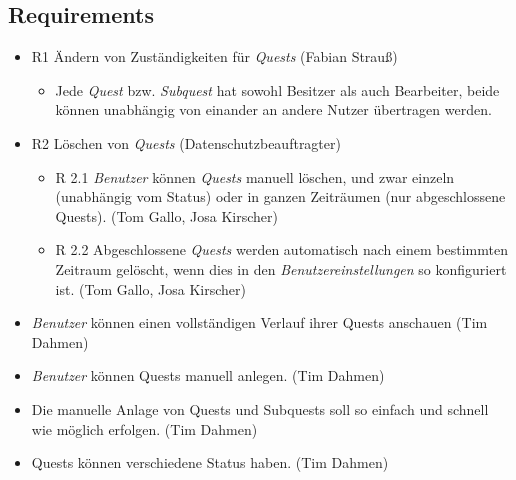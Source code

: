 \documentclass{article}
\begin{document}
\subsection{Requirements}

\begin{itemize}
\item R1 Ändern von Zuständigkeiten für \textit{Quests} (Fabian Strauß)
    \begin{itemize}
        \item Jede \textit{Quest} bzw. \textit{Subquest} hat sowohl Besitzer als auch Bearbeiter, beide können unabhängig von einander an andere Nutzer übertragen werden.
    \end{itemize}

\item R2 Löschen von \textit{Quests} (Datenschutzbeauftragter) 
	\begin{itemize}
	\item R 2.1 \textit{Benutzer} können \textit{Quests} manuell löschen, und zwar einzeln (unabhängig vom Status) oder in ganzen Zeiträumen (nur abgeschlossene Quests). (Tom Gallo, Josa Kirscher) 
	\item R 2.2 Abgeschlossene \textit{Quests} werden automatisch nach einem bestimmten Zeitraum gelöscht, wenn dies in den \textit{Benutzereinstellungen} so konfiguriert ist. (Tom Gallo, Josa Kirscher)
	\end{itemize}

\item \textit{Benutzer} können einen vollständigen Verlauf ihrer Quests anschauen (Tim Dahmen) 

\item \textit{Benutzer} können Quests manuell anlegen. (Tim Dahmen) 
\item Die manuelle Anlage von Quests und Subquests soll so einfach und schnell wie möglich erfolgen. (Tim Dahmen) 
\item Quests können verschiedene Status haben. (Tim Dahmen) 


\end{itemize}
\end{document}
